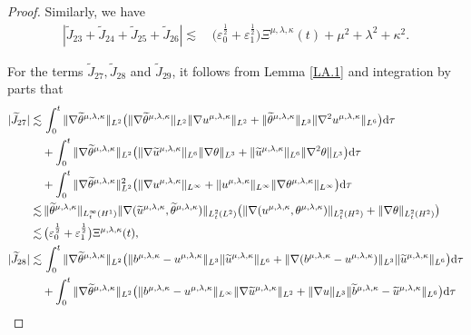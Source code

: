 \documentclass[reqno,11pt]{amsart}
\theoremstyle{plain}
\numberwithin{equation}{section}
\newcommand{\eps}{{\varepsilon}}
\begin{document}
\begin{proof}
Similarly, we have
\begin{align}\label{LNXL4.42}
|\widetilde{J}_{23}+\widetilde{J}_{24}+\widetilde{J}_{25}+\widetilde{J}_{26}| \lesssim&\,     \big(\eps_0^\frac{1}{2}+\eps_1^\frac{1}{2}\big){\Xi} ^{\mu,\lambda,\kappa}(t)+\mu^2+\lambda^2+\kappa^2.
\end{align} 

For the terms $\widetilde{J}_{27}, \widetilde{J}_{28}$ and $\widetilde{J}_{29}$, it follows from Lemma \ref{LA.1} and   integration by parts that  
\begin{align}
|\widetilde{J}_{27}|\lesssim&\,\int_0^t \|\nabla\widetilde\theta^{\mu,\lambda,\kappa}\|_{L^2}\big(\|\nabla \widetilde{\theta}^{\mu,\lambda,\kappa}\|_{L^2}\|\nabla u^{\mu,\lambda,\kappa}\|_{L^2}+\|\widetilde{\theta}^{\mu,\lambda,\kappa}\|_{L^3}\|\nabla^2 u^{\mu,\lambda,\kappa}\|_{L^6}\big){\rm d}\tau\nonumber\\
&+\int_0^t \|\nabla\widetilde\theta^{\mu,\lambda,\kappa}\|_{L^2}\big( \|\nabla  \widetilde{u}^{\mu,\lambda,\kappa}\|_{L^6}\|\nabla\theta\|_{L^3}+\|\widetilde{u}^{\mu,\lambda,\kappa}\|_{L^6}\|\nabla^2\theta\|_{L^3}\big){\rm d}\tau\nonumber\\
&+\int_0^t \|\nabla\widetilde\theta^{\mu,\lambda,\kappa}\|_{L^2}^2 \big(\|\nabla u^{\mu,\lambda,\kappa}\|_{L^\infty}+\|  u^{\mu,\lambda,\kappa}\|_{L^\infty}\|  \nabla\theta^{\mu,\lambda,\kappa}\|_{L^\infty}\big) {\rm d}\tau\nonumber\\
\lesssim&\, \| \widetilde{\theta}^{\mu,\lambda,\kappa}\|_{L_t^\infty(H^1)} \|\nabla(\widetilde{u}^{\mu,\lambda,\kappa},\widetilde{\theta}^{\mu,\lambda,\kappa})\|_{L_t^2(L^2)} \big( \|\nabla (u^{\mu,\lambda,\kappa},\theta^{\mu,\lambda,\kappa})\|_{L_t^2(H^2)}+\|\nabla\theta\|_{L_t^2(H^2)} \big)\nonumber\\
\lesssim&\,\big(\eps_0^\frac{1}{2}+\eps_1^\frac{1}{2}\big){\Xi} ^{\mu,\lambda,\kappa}(t),\label{G4.23-1}\\
|\widetilde{J}_{28}|\lesssim&\, \int_0^t  \|\nabla\widetilde{\theta}^{\mu,\lambda,\kappa}\|_{L^2}\big( \| b^{\mu,\lambda,\kappa}-u^{\mu,\lambda,\kappa}\|_{L^3}\|\widetilde{u}^{\mu,\lambda,\kappa}\|_{L^6}+\| \nabla(b^{\mu,\lambda,\kappa}-u^{\mu,\lambda,\kappa})\|_{L^3}\|\widetilde{u}^{\mu,\lambda,\kappa}\|_{L^6}\big){\rm d}\tau\nonumber\\
&+\int_0^t\|\nabla\widetilde{\theta}^{\mu,\lambda,\kappa}\|_{L^2}\big(\| b^{\mu,\lambda,\kappa}-u^{\mu,\lambda,\kappa}\|_{L^\infty}\|\nabla\widetilde{u}^{\mu,\lambda,\kappa}\|_{L^2}+\|\nabla u\|_{L^3}\| \widetilde{b}^{\mu,\lambda,\kappa}-\widetilde{u}^{\mu,\lambda,\kappa}\|_{L^6} \big){\rm d}\tau\nonumber\\

\end{align}
\end{proof}
\end{document}
